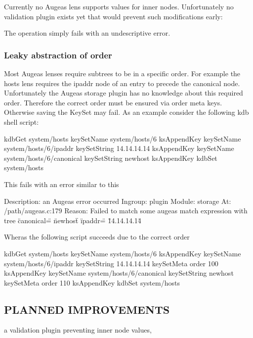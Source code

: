 Currently no Augeas lens supports values for inner nodes. Unfortunately no validation plugin exists yet that would prevent such modifications early\+: 


The operation simply fails with an undescriptive error.

\subsubsection*{Leaky abstraction of order}

Most Augeas lenses require subtrees to be in a specific order. For example the hosts lens requires the ipaddr node of an entry to precede the canonical node. Unfortunately the Augeas storage plugin has no knowledge about this required order. Therefore the correct order must be ensured via order meta keys. Otherwise saving the Key\+Set may fail. As an example consider the following kdb shell script\+: \begin{DoxyVerb}    kdbGet system/hosts
    keySetName system/hosts/6
    ksAppendKey
    keySetName system/hosts/6/ipaddr
    keySetString 14.14.14.14
    ksAppendKey
    keySetName system/hosts/6/canonical
    keySetString newhost
    ksAppendKey
    kdbSet system/hosts
\end{DoxyVerb}


This fails with an error similar to this \begin{DoxyVerb}    Description: an Augeas error occurred
    Ingroup: plugin
    Module: storage
    At: /path/augeas.c:179
    Reason: Failed to match
    some augeas match expression
    with tree
    { \"canonical\" = \"newhost\" } { \"ipaddr\" = \"14.14.14.14\" }
\end{DoxyVerb}


Wheras the following script succeeds due to the correct order \begin{DoxyVerb}    kdbGet system/hosts
    keySetName system/hosts/6
    ksAppendKey
    keySetName system/hosts/6/ipaddr
    keySetString 14.14.14.14
    keySetMeta order 100
    ksAppendKey
    keySetName system/hosts/6/canonical
    keySetString newhost
    keySetMeta order 110
    ksAppendKey
    kdbSet system/hosts
\end{DoxyVerb}


\subsection*{P\+L\+A\+N\+N\+E\+D I\+M\+P\+R\+O\+V\+E\+M\+E\+N\+T\+S}


\begin{DoxyItemize}
\item a validation plugin preventing inner node values, 
\end{DoxyItemize}